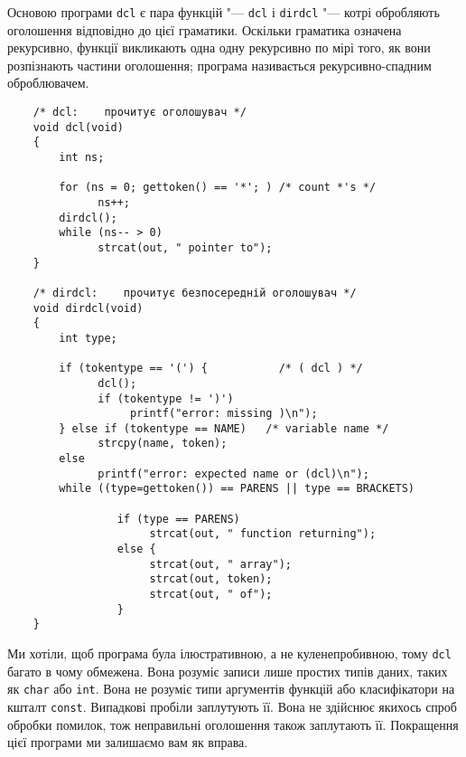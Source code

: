 \documentclass[a4paper,12pt]{book}
\begin{document}
  Основою програми \texttt{dcl} є пара функцій "--- \texttt{dcl} і \texttt{dirdcl}
  "--- котрі обробляють оголошення відповідно до цієї граматики. Оскільки граматика
  означена рекурсивно, функції викликають одна одну рекурсивно по мірі того, як вони
  розпізнають частини оголошення; програма називається рекурсивно-спадним оброблювачем.

  \begin{verbatim}
    /* dcl:    прочитує оголошувач */
    void dcl(void)
    {
        int ns;

        for (ns = 0; gettoken() == '*'; ) /* count *'s */
              ns++;
        dirdcl();
        while (ns-- > 0)
              strcat(out, " pointer to");
    }

    /* dirdcl:    прочитує безпосередній оголошувач */
    void dirdcl(void)
    {
        int type;

        if (tokentype == '(') {           /* ( dcl ) */
              dcl();
              if (tokentype != ')')
                   printf("error: missing )\n");
        } else if (tokentype == NAME)   /* variable name */
              strcpy(name, token);
        else
              printf("error: expected name or (dcl)\n");
        while ((type=gettoken()) == PARENS || type == BRACKETS)

                 if (type == PARENS)
                      strcat(out, " function returning");
                 else {
                      strcat(out, " array");
                      strcat(out, token);
                      strcat(out, " of");
                 }
    }
  \end{verbatim}

  Ми хотіли, щоб програма була ілюстративною, а не куленепробивною, тому \texttt{dcl} багато в чому
  обмежена. Вона розуміє записи лише простих типів даних, таких як \texttt{char} або
  \texttt{int}. Вона не розуміє типи аргументів функцій або класифікатори на кшталт
  \texttt{const}. Випадкові пробіли заплутують її. Вона не здійснює якихось спроб обробки
  помилок, тож неправильні оголошення також заплутають її. Покращення цієї програми ми
  залишаємо вам як вправа.
\end{document}
